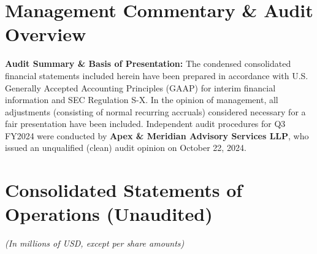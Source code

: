 \documentclass[10pt,a4paper]{article}
\begin{document}
\vspace{-4pt}

\section{Management Commentary \& Audit Overview}

\begin{tcolorbox}[colback=LightBg, colframe=BrandBlue, boxrule=0.6pt, arc=1.5mm, left=8pt, right=8pt, top=4pt, bottom=4pt]
  {\small\bfseries Audit Summary \& Basis of Presentation:} The condensed consolidated financial statements included herein have been prepared in accordance with U.S. Generally Accepted Accounting Principles (GAAP) for interim financial information and SEC Regulation S-X. In the opinion of management, all adjustments (consisting of normal recurring accruals) considered necessary for a fair presentation have been included. Independent audit procedures for Q3 FY2024 were conducted by \textbf{Apex \& Meridian Advisory Services LLP}, who issued an unqualified (clean) audit opinion on October 22, 2024.
\end{tcolorbox}

\section{Consolidated Statements of Operations (Unaudited)}
{\small\itshape (In millions of USD, except per share amounts)}
\end{document}
